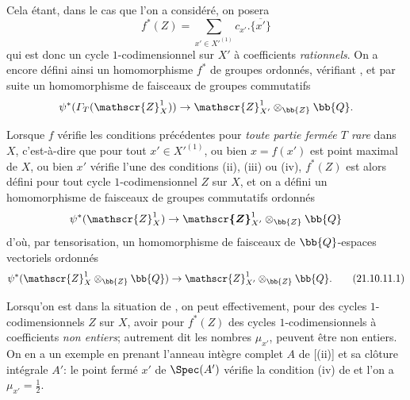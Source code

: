 \begin{env}[21.10.11]
Cela étant, dans le cas que l'on a considéré, on posera
\[
  f^*(Z)=\sum_{x'\in X'^{(1)}}c_{x'}.\overline{\{x'\}}
\]
qui est donc un cycle $1$-codimensionnel sur $X'$ à coefficients \emph{rationnels}.
On a encore défini ainsi un homomorphisme $f^*$ de groupes ordonnés, vérifiant , et par suite un homomorphisme de faisceaux de groupes commutatifs
\[
  \psi^*(\varGamma_T(\mathscr{Z}^1_X))\to\mathscr{Z}^1_{X'}\otimes_{\bb{Z}}\bb{Q}.
\]

Lorsque $f$ vérifie les conditions précédentes pour \emph{toute partie fermée $T$ rare} dans $X$, c'est-à-dire que pour tout $x'\in X'^{(1)}$, ou bien $x=f(x')$ est point maximal de $X$, ou bien $x'$ vérifie l'une des conditions (ii), (iii) ou (iv), $f^*(Z)$ est alors défini pour tout cycle $1$-codimensionnel $Z$ sur $X$, et on a défini un homomorphisme de faisceaux de groupes commutatifs ordonnés
\[
  \psi^*(\mathscr{Z}^1_X)\to\boldsymbol{\mathscr{Z}}^1_{X'}\otimes_{\bb{Z}}\bb{Q}
\]
d'où, par tensorisation, un homomorphisme de faisceaux de $\bb{Q}$-espaces vectoriels ordonnés
\[
\label{IV.21.10.11.1}
  \psi^*(\mathscr{Z}^1_X\otimes_{\bb{Z}}\bb{Q})\to\mathscr{Z}^1_{X'}\otimes_{\bb{Z}}\bb{Q}.
  \tag{21.10.11.1}
\]
\end{env}

\begin{remark}[21.10.12]
\label{IV.21.10.12}
Lorsqu'on est dans la situation de , on peut effectivement, pour des cycles $1$-codimensionnels $Z$ sur $X$, avoir pour $f^*(Z)$ des cycles $1$-codimensionnels à coefficients \emph{non entiers}; autrement dit les nombres $\mu_{x'}$, peuvent être non entiers.
On en a un exemple en prenant l'anneau intègre complet $A$ de [(ii)] et sa clôture intégrale $A'$: le point fermé $x'$ de $\Spec(A')$ vérifie la condition (iv) de  et l'on a $\mu_{x'}=\frac12$.
\end{remark}

